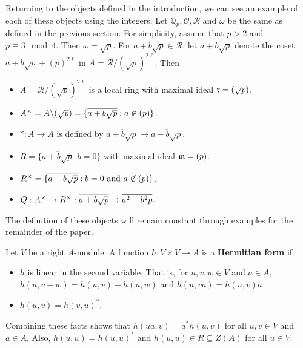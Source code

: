\begin{example}\label{ex2.1}
Returning to the objects defined in the introduction, we can see an example of each of these objects using the \padic integers.
Let $\mathbb{Q}_p, \mathcal{O}, \mathcal{R}$ and $\omega$ be the same as defined in the previous section.
For simplicity, assume that $p > 2$ and $p \equiv 3 \mod 4$.
Then $\omega = \sqrt{p}$.
For $a + b \sqrt{p} \in \mathcal{R}$, let $\overline{a + b\sqrt{p}}$ denote the coset $a + b\sqrt{p} + (p)^{2\ell}$ in $A = \mathcal{R} / (\sqrt{p})^{2\ell}$.
Then
\begin{itemize}
\item $A = \mathcal{R}/(\sqrt{p})^{2\ell}$ is a local ring with maximal ideal $\mathfrak{r} = (\sqrt{p})$.

\item $A^\times = A \backslash (\sqrt{p}) = \{\overline{a + b \sqrt{p}} : a \not\in (p) \}$.

\item $*: A \to A$ is defined by $\overline{a + b\sqrt{p}} \mapsto \overline{a - b\sqrt{p}}$.

\item $R = \{\overline{a + b\sqrt{p}} : b = 0\}$ with maximal ideal $\mathfrak{m} = (p)$.

\item $R^\times = \{\overline{a + b\sqrt{p}}: b = 0 \text{ and } a \not\in (p)\}$.

\item $Q: A^\times \to R^\times: \overline{a + b\sqrt{p}} \mapsto \overline{a^2 - b^2 p}$.
\end{itemize}
The definition of these objects will remain constant through examples for the remainder of the paper.
\end{example}

Let $V$ be a right $A$-module. 
A function $h: V \times V \to A$ is a \textbf{Hermitian form} if
\begin{itemize}
\item $h$ is linear in the second variable.
That is, for $u, v, w \in V$ and $a \in A$, $h(u, v + w) = h(u, v) + h(u, w)$ and $h(u, va) = h(u, v)a$
\item $h(u,v) = h(v, u)^*$.
\end{itemize}
Combining these facts shows that $h(ua, v) = a^* h(u, v)$ for all $u, v \in V$ and $a \in A$.
Also, $h(u,u) = h(u,u)^*$ and $h(u,u) \in R \subseteq Z(A)$ for all $u \in V$.

